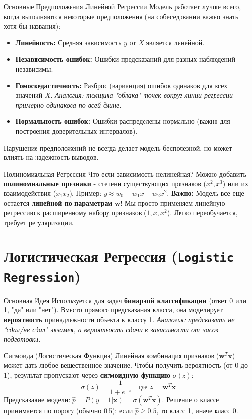 \begin{alerttextbox}{Основные Предположения Линейной Регрессии}
Модель работает лучше всего, когда выполняются некоторые предположения (на собеседовании важно знать хотя бы названия):
\begin{itemize}
    \item \textbf{Линейность:} Средняя зависимость $y$ от $X$ является линейной.
    \item \textbf{Независимость ошибок:} Ошибки предсказаний для разных наблюдений независимы.
    \item \textbf{Гомоскедастичность:} Разброс (варианция) ошибок одинаков для всех значений $X$. \textit{Аналогия: толщина "облака" точек вокруг линии регрессии примерно одинакова по всей длине.}
    \item \textbf{Нормальность ошибок:} Ошибки распределены нормально (важно для построения доверительных интервалов).
\end{itemize}
Нарушение предположений не всегда делает модель бесполезной, но может влиять на надежность выводов.
\end{alerttextbox}

\begin{myblock}{Полиномиальная Регрессия}
Что если зависимость нелинейная? Можно добавить \textbf{полиномиальные признаки} - степени существующих признаков ($x^2, x^3$) или их взаимодействия ($x_1 x_2$).
Пример: $y \approx w_0 + w_1 x + w_2 x^2$.
\textbf{Важно:} Модель все еще остается \textbf{линейной по параметрам} $\mathbf{w}$! Мы просто применяем линейную регрессию к расширенному набору признаков ($1, x, x^2$). Легко переобучается, требует регуляризации.
\end{myblock}

\section{Логистическая Регрессия (\texttt{Logistic Regression})}

\begin{textbox}{Основная Идея}
Используется для задач \textbf{бинарной классификации} (ответ 0 или 1, "да" или "нет"). Вместо прямого предсказания класса, она моделирует \textbf{вероятность} принадлежности объекта к классу 1.
\textit{Аналогия: предсказать не "сдал/не сдал" экзамен, а вероятность сдачи в зависимости от часов подготовки.}
\end{textbox}

\begin{myblock}{Сигмоида (Логистическая Функция)}
Линейная комбинация признаков ($\mathbf{w}^T \mathbf{x}$) может дать любое вещественное значение. Чтобы получить вероятность (от 0 до 1), результат пропускают через \textbf{сигмоидную функцию} $\sigma(z)$:
\[
\sigma(z) = \frac{1}{1 + e^{-z}} \quad \text{где } z = \mathbf{w}^T \mathbf{x}
\]
Предсказание модели: $\hat{p} = P(y=1 | \mathbf{x}) = \sigma(\mathbf{w}^T \mathbf{x})$.
Решение о классе принимается по порогу (обычно 0.5): если $\hat{p} \ge 0.5$, то класс 1, иначе класс 0.
\end{myblock}

